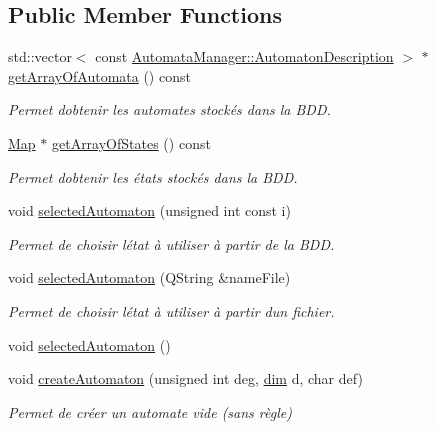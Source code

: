 \subsection*{Public Member Functions}
\begin{DoxyCompactItemize}
\item 
std\+::vector$<$ const \mbox{\hyperlink{class_automata_manager_1_1_automaton_description}{Automata\+Manager\+::\+Automaton\+Description}} $>$ $\ast$ \mbox{\hyperlink{class_automata_manager_af843cad341a4b2fa4dc932a6e225e3a0}{get\+Array\+Of\+Automata}} () const
\begin{DoxyCompactList}\small\item\em Permet d\textquotesingle{}obtenir les automates stockés dans la B\+DD. \end{DoxyCompactList}\item 
\mbox{\hyperlink{automatamanager_8h_a83622686c79f1453f6971e58d371a481}{Map}} $\ast$ \mbox{\hyperlink{class_automata_manager_adda0cd11e599066e2c17e12d0025ff86}{get\+Array\+Of\+States}} () const
\begin{DoxyCompactList}\small\item\em Permet d\textquotesingle{}obtenir les états stockés dans la B\+DD. \end{DoxyCompactList}\item 
void \mbox{\hyperlink{class_automata_manager_a36178106743ae4a2df694ba2d37fd7f8}{selected\+Automaton}} (unsigned int const i)
\begin{DoxyCompactList}\small\item\em Permet de choisir l\textquotesingle{}état à utiliser à partir de la B\+DD. \end{DoxyCompactList}\item 
void \mbox{\hyperlink{class_automata_manager_a9143d0dfd5f3cf046e4b254e8b99f92b}{selected\+Automaton}} (Q\+String \&name\+File)
\begin{DoxyCompactList}\small\item\em Permet de choisir l\textquotesingle{}état à utiliser à partir d\textquotesingle{}un fichier. \end{DoxyCompactList}\item 
void \mbox{\hyperlink{class_automata_manager_a2c57916b8483cb830cbd69fddaab8661}{selected\+Automaton}} ()
\item 
void \mbox{\hyperlink{class_automata_manager_a12dcc64dec9939b5decca89140c865e2}{create\+Automaton}} (unsigned int deg, \mbox{\hyperlink{automatamanager_8h_ae6fa959b9e8f9c638e0d82bf2c7dc5e7}{dim}} d, char def)
\begin{DoxyCompactList}\small\item\em Permet de créer un automate vide (sans règle) \end{DoxyCompactList}\item 

\end{DoxyCompactItemize}

